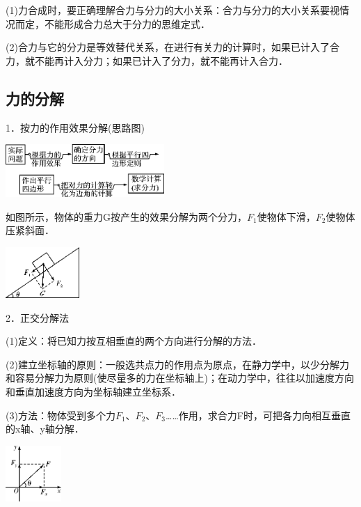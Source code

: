 \documentclass[cn,10.5pt,chinese,mac,chinesefont=founder]{elegantbook}
\begin{document}
(1)力合成时，要正确理解合力与分力的大小关系：合力与分力的大小关系要视情况而定，不能形成合力总大于分力的思维定式．

(2)合力与它的分力是等效替代关系，在进行有关力的计算时，如果已计入了合力，就不能再计入分力；如果已计入了分力，就不能再计入合力．
\newpage
\subsection{力的分解}

1．按力的作用效果分解(思路图)

\begin{center}\includegraphics[width=2.375in,height=0.79167in]{media/image70.png}\end{center}

如图所示，物体的重力G按产生的效果分解为两个分力，$F_1$使物体下滑，$F_2$使物体压紧斜面．

\begin{center}\includegraphics[width=1.10417in,height=0.76042in]{media/image71.png}\end{center}

2．正交分解法

(1)定义：将已知力按互相垂直的两个方向进行分解的方法．

(2)建立坐标轴的原则：一般选共点力的作用点为原点，在静力学中，以少分解力和容易分解力为原则(使尽量多的力在坐标轴上)；在动力学中，往往以加速度方向和垂直加速度方向为坐标轴建立坐标系．

(3)方法：物体受到多个力$F_1$、$F_2$、$F_3$\ldots\ldots 作用，求合力F时，可把各力向相互垂直的x轴、y轴分解．

\begin{center}\includegraphics[width=0.83333in,height=0.83333in]{media/image72.png}\end{center}
\end{document}
